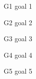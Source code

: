 \begin{enumerate}
	\item
		[G1] goal 1
	\item
		[G2] goal 2
	\item 
		[G3] goal 3
	\item 
		[G4] goal 4
	\item 
		[G5] goal 5
\end{enumerate}	